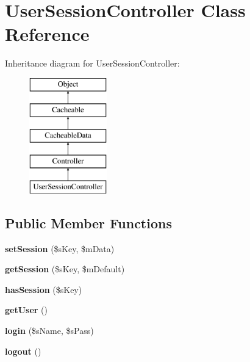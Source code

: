 \hypertarget{class_user_session_controller}{\section{User\-Session\-Controller Class Reference}
\label{class_user_session_controller}
}
Inheritance diagram for User\-Session\-Controller\-:\begin{figure}[H]
\begin{center}
\leavevmode
\includegraphics[height=5.000000cm]{class_user_session_controller}
\end{center}
\end{figure}
\subsection*{Public Member Functions}
\begin{DoxyCompactItemize}
\item 
\hypertarget{class_user_session_controller_a8d52a2ffce5f799981557fd8991efbcd}{{\bfseries set\-Session} (\$s\-Key, \$m\-Data)}\label{class_user_session_controller_a8d52a2ffce5f799981557fd8991efbcd}

\item 
\hypertarget{class_user_session_controller_a7b5fcb3714fc9e2a52a12e99bb1abec2}{{\bfseries get\-Session} (\$s\-Key, \$m\-Default)}\label{class_user_session_controller_a7b5fcb3714fc9e2a52a12e99bb1abec2}

\item 
\hypertarget{class_user_session_controller_ad6ad0f0b361fc4292d7b556ca0d57aee}{{\bfseries has\-Session} (\$s\-Key)}\label{class_user_session_controller_ad6ad0f0b361fc4292d7b556ca0d57aee}

\item 
\hypertarget{class_user_session_controller_a038cb106c4b10081042b39c5c4a4b481}{{\bfseries get\-User} ()}\label{class_user_session_controller_a038cb106c4b10081042b39c5c4a4b481}

\item 
\hypertarget{class_user_session_controller_a117086580e759775072d89584bd8ccc4}{{\bfseries login} (\$s\-Name, \$s\-Pass)}\label{class_user_session_controller_a117086580e759775072d89584bd8ccc4}

\item 
\hypertarget{class_user_session_controller_aa13b1fec89f77fb12444aa85a9324579}{{\bfseries logout} ()}\label{class_user_session_controller_aa13b1fec89f77fb12444aa85a9324579}

\end{DoxyCompactItemize}
